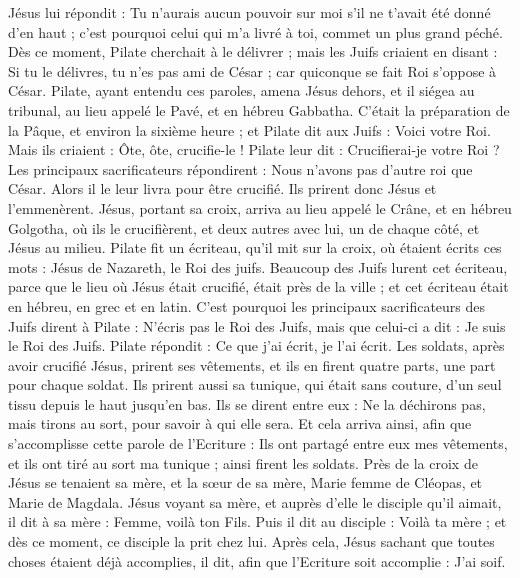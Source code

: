 \begin{multicols}{2}
Jésus lui répondit : Tu n'aurais aucun pouvoir sur moi s'il ne t'avait été donné d'en haut ; c'est pourquoi celui qui m'a livré à toi, commet un plus grand péché.
Dès ce moment, Pilate cherchait à le délivrer ; mais les Juifs criaient en disant : Si tu le délivres, tu n'es pas ami de César ; car quiconque se fait Roi s'oppose à César.
Pilate, ayant entendu ces paroles, amena Jésus dehors, et il siégea au tribunal, au lieu appelé le Pavé, et en hébreu Gabbatha.
C'était la préparation de la Pâque, et environ la sixième heure ; et Pilate dit aux Juifs : Voici votre Roi.
Mais ils criaient : Ôte, ôte, crucifie-le ! Pilate leur dit : Crucifierai-je votre Roi ? Les principaux sacrificateurs répondirent : Nous n'avons pas d'autre roi que César.
Alors il le leur livra pour être crucifié. Ils prirent donc Jésus et l'emmenèrent.
Jésus, portant sa croix, arriva au lieu appelé le Crâne, et en hébreu Golgotha,
où ils le crucifièrent, et deux autres avec lui, un de chaque côté, et Jésus au milieu.
Pilate fit un écriteau, qu'il mit sur la croix, où étaient écrits ces mots : Jésus de Nazareth, le Roi des juifs.
Beaucoup des Juifs lurent cet écriteau, parce que le lieu où Jésus était crucifié, était près de la ville ; et cet écriteau était en hébreu, en grec et en latin.
C'est pourquoi les principaux sacrificateurs des Juifs dirent à Pilate : N'écris pas le Roi des Juifs, mais que celui-ci a dit : Je suis le Roi des Juifs.
Pilate répondit : Ce que j'ai écrit, je l'ai écrit.
Les soldats, après avoir crucifié Jésus, prirent ses vêtements, et ils en firent quatre parts, une part pour chaque soldat. Ils prirent aussi sa tunique, qui était sans couture, d'un seul tissu depuis le haut jusqu'en bas.
Ils se dirent entre eux : Ne la déchirons pas, mais tirons au sort, pour savoir à qui elle sera. Et cela arriva ainsi, afin que s'accomplisse cette parole de l'Ecriture : Ils ont partagé entre eux mes vêtements, et ils ont tiré au sort ma tunique ; ainsi firent les soldats.
Près de la croix de Jésus se tenaient sa mère, et la sœur de sa mère, Marie femme de Cléopas, et Marie de Magdala.
Jésus voyant sa mère, et auprès d'elle le disciple qu'il aimait, il dit à sa mère : Femme, voilà ton Fils.
Puis il dit au disciple : Voilà ta mère ; et dès ce moment, ce disciple la prit chez lui.
Après cela, Jésus sachant que toutes choses étaient déjà accomplies, il dit, afin que l'Ecriture soit accomplie : J'ai soif.

\end{multicols}
